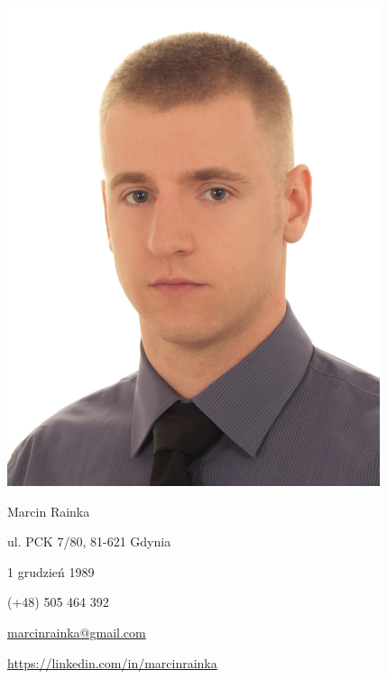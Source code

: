 \documentclass[11pt,a4paper]{article}
\begin{document}
    \pagestyle{empty}
  
    \noindent
    \begin{minipage}[b]{0.4\textwidth}
        \begin{center}
            \includegraphics{photo.png}
        \end{center}
    \end{minipage}
    \begin{minipage}[b]{0.6\textwidth}
        {\Huge \sc Marcin Rainka}
        \begin{description} \itemsep2pt \parskip0pt 
            \item[Adres] ul. PCK 7/80, 81-621 Gdynia
            \item[Data urodzenia] 1 grudzień 1989
            \item[Telefon] (+48) 505 464 392
            \item[E-mail] \href{mailto:marcinrainka@gmail.com}{marcinrainka@gmail.com}
            \item[LinkedIn] \url{https://linkedin.com/in/marcinrainka}
        \end{description}
    \end{minipage}
  
    \vspace{0.1cm}
  
\end{document}
